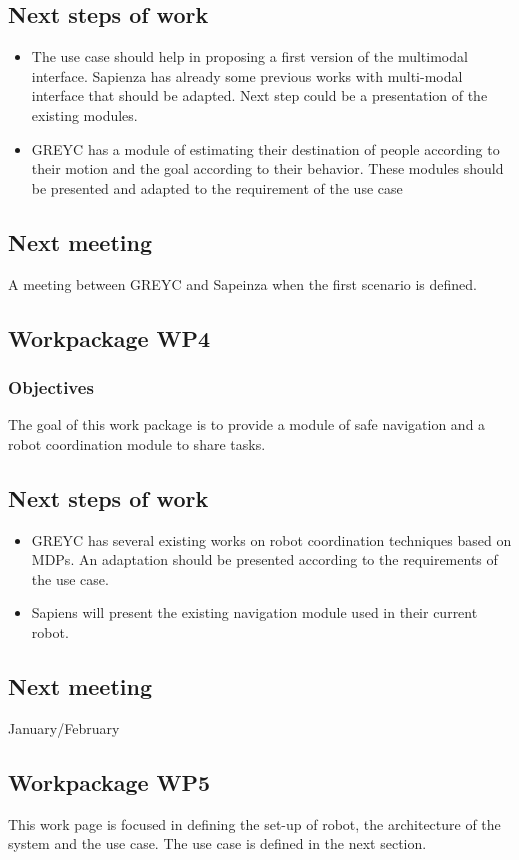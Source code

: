 \documentclass{article}
\begin{document}
\subsection*{Next steps of work}
\begin{itemize}
\item The use case should help in proposing a first version of the multimodal interface. Sapienza has already some previous works with multi-modal interface that should be adapted. Next step could be a presentation of the existing modules.
\item GREYC has a module of estimating their destination of people according to their motion and the goal according to their behavior. These modules should be presented and adapted to the requirement of the use case 
\end{itemize}
\subsection*{Next meeting}
A meeting between GREYC and Sapeinza when the first scenario is defined.

\subsection{Workpackage WP4}
\subsubsection*{Objectives}
The goal of this work package is to provide a module of safe navigation and a robot coordination  module to share tasks. 

\subsection*{Next steps of work}
\begin{itemize}
\item GREYC has several existing works on robot coordination techniques based on MDPs. An adaptation should be presented according to the requirements of the use case. 
\item Sapiens will present the existing navigation module used in their current robot. 
\end{itemize}
\subsection*{Next meeting}
January/February 
\subsection{Workpackage WP5}
This work page is focused in defining the set-up of robot, the architecture of the system and the use case. The use case is defined in the next section. 
\end{document}
